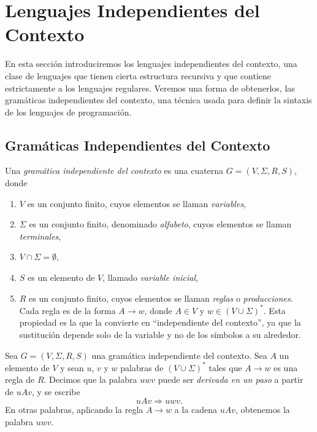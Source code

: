 \documentclass[twoside]{article}
\begin{document}
\tableofcontents

\newpage

\section{Lenguajes Independientes del Contexto}

En esta sección introduciremos los lenguajes independientes del contexto, una clase de lenguajes que tienen cierta estructura recursiva y que contiene estrictamente a los lenguajes regulares. Veremos una forma de obtenerlos, las gramáticas independientes del contexto, una técnica usada para definir la sintaxis de los lenguajes de programación. 

\subsection{Gramáticas Independientes del Contexto}

\begin{defi}
Una \emph{gramática independiente del contexto} es una cuaterna $G=(V,\Sigma,R,S)$, donde
\begin{enumerate}
\item $V$ es un conjunto finito, cuyos elementos se llaman \emph{variables},
\item $\Sigma$ es un conjunto finito, denominado \emph{alfabeto}, cuyos elementos se llaman \emph{terminales},
\item $V\cap\Sigma=\emptyset$,
\item $S$ es un elemento de $V$, llamado \emph{variable inicial},
\item $R$ es un conjunto finito, cuyos elementos se llaman \emph{reglas} o \emph{producciones}. Cada regla es de la forma $A\to w$, donde $A\in V$ y $w\in(V\cup\Sigma)^*$. Esta propiedad es la que la convierte en ``independiente del contexto'', ya que la sustitución depende solo de la variable y no de los símbolos a su alrededor.
\end{enumerate}
\end{defi}

\begin{defi}
Sea $G=(V,\Sigma,R,S)$ una gramática independiente del contexto. Sea $A$ un elemento de $V$ y sean $u$, $v$ y $w$ palabras de $(V\cup\Sigma)^*$ tales que $A\to w$ es una regla de $R$. Decimos que la palabra $uwv$ puede ser \emph{derivada en un paso} a partir de $uAv$, y se escribe
$$uAv\Rightarrow uwv.$$
En otras palabras, aplicando la regla $A\to w$ a la cadena $uAv$, obtenemos la palabra $uwv$.
\end{defi}
\end{document}
